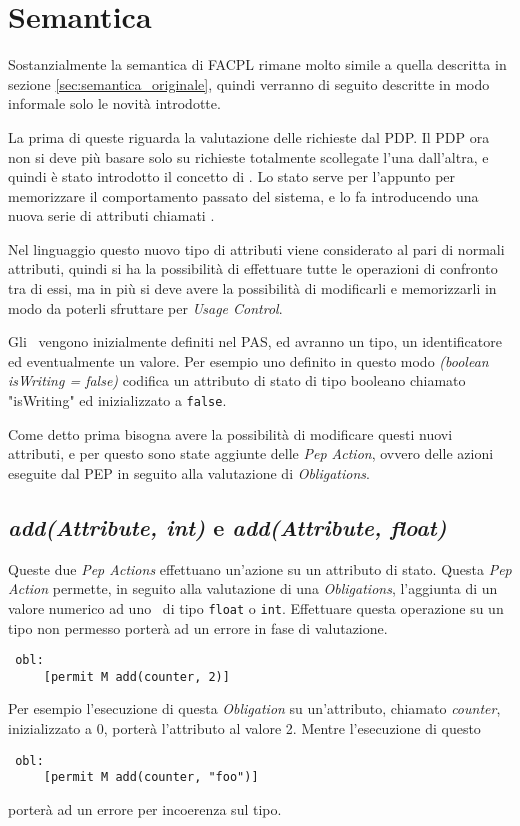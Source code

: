 \section{Semantica} %
\label{sec:semantica}
Sostanzialmente la semantica di FACPL rimane molto simile a quella descritta in sezione \ref{sec:semantica_originale}, quindi verranno di seguito descritte in modo informale solo le novità introdotte.\\ \par
La prima di queste riguarda la valutazione delle richieste dal PDP. Il PDP ora non si deve più basare solo su richieste totalmente scollegate l'una dall'altra, e quindi è stato introdotto il concetto di \status.
Lo stato serve per l'appunto per memorizzare il comportamento passato del sistema, e lo fa introducendo una nuova serie di attributi chiamati \statusattribute.\\ \par
Nel linguaggio questo nuovo tipo di attributi viene considerato al pari di normali attributi, quindi si ha la possibilità di effettuare tutte le operazioni di confronto tra di essi, ma in più si deve avere la possibilità di modificarli e memorizzarli in modo da poterli sfruttare per \textit{Usage Control}.\\ \par
Gli \statusattribute \ vengono inizialmente definiti nel PAS, ed avranno un tipo, un identificatore ed eventualmente un valore. Per esempio uno \statusattribute definito in questo modo \textit{(boolean isWriting = false)} codifica un attributo di stato di tipo booleano chiamato "isWriting" ed inizializzato a \texttt{false}.\\ \par
Come detto prima bisogna avere la possibilità di modificare questi nuovi attributi, e per questo sono state aggiunte delle \textit{Pep Action}, ovvero delle azioni eseguite dal PEP in seguito alla valutazione di \textit{Obligations}.
\subsection*{\textit{add(Attribute, int)} e \textit{add(Attribute, float)}} %
\label{ssub:opadd}
Queste due \textit{Pep Actions} effettuano un'azione su un attributo di stato. Questa \textit{Pep Action} permette, in seguito alla valutazione di una \textit{Obligations}, l'aggiunta di un valore numerico ad uno \statusattribute \ di tipo \texttt{float} o \texttt{int}. Effettuare questa operazione su un tipo non permesso porterà ad un errore in fase di valutazione.
\begin{verbatim}
 obl:
     [permit M add(counter, 2)]
\end{verbatim}
Per esempio l'esecuzione di questa \textit{Obligation} su un'attributo, chiamato \textit{counter}, inizializzato a 0, porterà l'attributo al valore 2.
Mentre l'esecuzione di questo
\begin{verbatim}
 obl:
     [permit M add(counter, "foo")]
\end{verbatim}
porterà ad un errore per incoerenza sul tipo.
